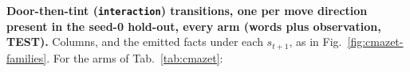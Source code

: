 \textbf{Door-then-tint (\texttt{interaction}) transitions, one per move direction present in the seed-0 hold-out, every arm (words plus observation, TEST).} Columns, and the emitted facts under each $s_{t+1}$, as in Fig.~\ref{fig:cmazet-families}. For the arms of Tab.~\ref{tab:cmazet}: 
